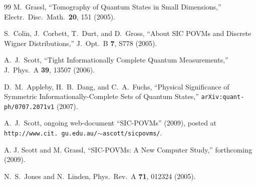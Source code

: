 \documentclass[letterpaper,11pt]{article}
\begin{document}
\begin{thebibliography}{99}
M.~Grassl, ``Tomography of Quantum States in Small Dimensions,'' Electr.\ Disc.\ Math.\ {\bf 20}, 151 (2005).

S.~Colin, J.~Corbett, T.~Durt, and D.~Gross, ``About SIC POVMs and Discrete Wigner Distributions,'' J.~Opt.\ B {\bf 7}, S778 (2005).

A.~J.~Scott, ``Tight Informationally Complete Quantum Measurements,'' J.~Phys.\ A {\bf 39}, 13507 (2006).

D.~M.~Appleby, H.~B.~Dang, and C.~A.~Fuchs, ``Physical Significance of Symmetric Informationally-Complete Sets of Quantum States,'' {\tt arXiv:quant-ph/0707.2071v1} (2007).

A.~J.~Scott, ongoing web-document ``SIC-POVMs'' (2009), posted at
{\tt http://www.cit.\ \hspace{-1.2ex}gu.edu.au/$\sim$ascott/sicpovms/}.

A. J. Scott and M. Grassl, ``SIC-POVMs:  A New Computer Study,'' forthcoming (2009).

N.~S.~Jones and N.~Linden, Phys.\ Rev.~A \textbf{71}, 012324 (2005).



\end{thebibliography}
\end{document}
